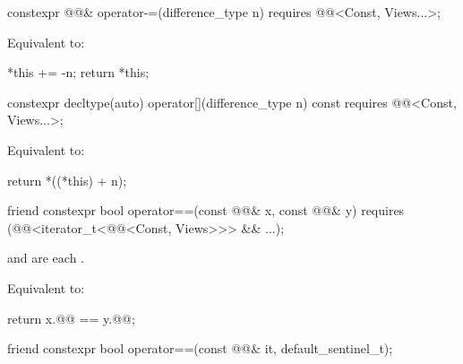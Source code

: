 %
\begin{itemdecl}
constexpr @@& operator-=(difference_type n)
  requires @@<Const, Views...>;
\end{itemdecl}

\begin{itemdescr}
\pnum
\effects
Equivalent to:
\begin{codeblock}
*this += -n;
return *this;
\end{codeblock}
\end{itemdescr}

%
\begin{itemdecl}
constexpr decltype(auto) operator[](difference_type n) const
  requires @@<Const, Views...>;
\end{itemdecl}

\begin{itemdescr}
\pnum
\effects
Equivalent to:
\begin{codeblock}
return *((*this) + n);
\end{codeblock}
\end{itemdescr}

%
\begin{itemdecl}
friend constexpr bool operator==(const @@& x, const @@& y)
  requires (@@<iterator_t<@@<Const, Views>>> && ...);
\end{itemdecl}

\begin{itemdescr}
\pnum
\expects
{} and
 are each .

\pnum
\effects
Equivalent to:
\begin{codeblock}
return x.@@ == y.@@;
\end{codeblock}
\end{itemdescr}

%
\begin{itemdecl}
friend constexpr bool operator==(const @@& it, default_sentinel_t);
\end{itemdecl}

